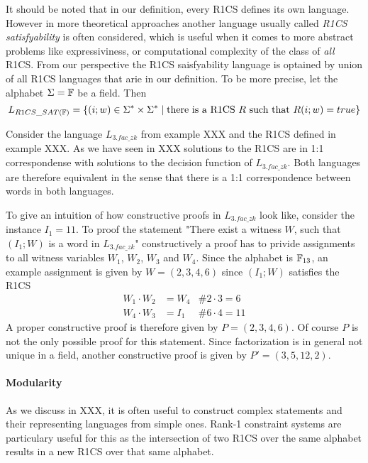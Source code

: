 \begin{remark}[R1CS satisfyability] It should be noted that in our definition, every R1CS defines its own language. However in more theoretical approaches another language usually called \textit{R1CS satisfyability} is often considered, which is useful when it comes to more abstract problems like expressiviness, or computational complexity of the class of \textit{all} R1CS. From our perspective the R1CS saisfyability language is optained by union of all R1CS languages that arie in our definition. To be more precise, let the alphabet $\Sigma=\mathbb{F}$ be a field. Then 
$$
L_{R1CS\_SAT(\mathbb{F})} = \{(i;w)\in \Sigma^*\times \Sigma^*\;|\; \text{there is a R1CS $R$ such that } R(i;w)=true  \}
$$
\end{remark}
\begin{example}[3-Factorization]Consider the language $L_{3.fac\_zk}$ from example XXX and the R1CS defined in example XXX. As we have seen in XXX solutions to the R1CS are in 1:1 correspondense with solutions to the decision function of $L_{3.fac\_zk}$. Both languages are therefore equivalent in the sense that there is a 1:1 correspondence between words in both languages.

To give an intuition of how constructive proofs in $L_{3.fac\_zk}$ look like, consider the instance $I_1= 11$. To proof the statement "There exist a witness $W$, such that $(I_1;W)$ is a word in $L_{3.fac\_zk}$" constructively a proof has to privide assignments to all witness variables $W_1$, $W_2$, $W_3$ and $W_4$. Since the alphabet is $\mathbb{F}_{13}$, an example assignment is given by
$W=(2,3,4,6)$ since $(I_1;W)$ satisfies the R1CS
\begin{align*}
W_1 \cdot W_2 &= W_4 & \text{\# } 2\cdot 3 = 6\\
W_4 \cdot W_3 &= I_1 & \text{\# } 6\cdot 4 = 11
\end{align*}
A proper constructive proof is therefore given by $P=(2,3,4,6)$. Of course $P$ is not the only possible proof for this statement. Since factorization is in general not unique in a field, another constructive proof is given by $P'=(3,5,12,2)$. 
\end{example}
\paragraph{Modularity} As we discuss in XXX, it is often useful to construct complex statements and their representing languages from simple ones. Rank-1 constraint systems are particulary useful for this as the intersection of two R1CS over the same alphabet results in a new R1CS over that same alphabet. 

